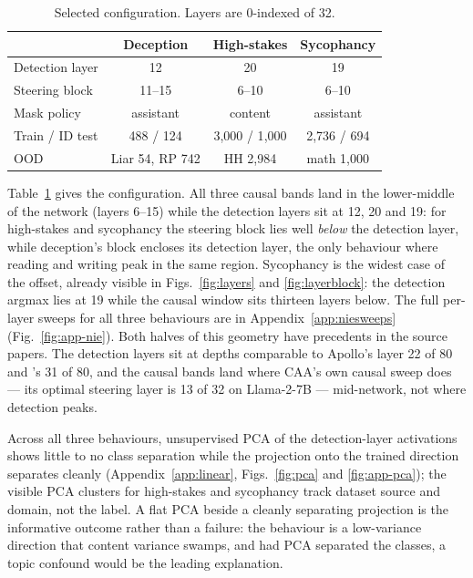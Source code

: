 \documentclass[conference]{IEEEtran}
\begin{document}
\begin{table}[t]
\caption{Selected configuration. Layers are 0-indexed of 32.}
\label{tab:config}
\centering
\small
\setlength{\tabcolsep}{3.5pt}
\begin{tabular}{lccc}
\toprule
& \textbf{Deception} & \textbf{High-stakes} & \textbf{Sycophancy} \\
\midrule
Detection layer & 12 & 20 & 19 \\
Steering block  & 11--15 & 6--10 & 6--10 \\
Mask policy & assistant & content & assistant \\
Train / ID test & 488 / 124 & 3{,}000 / 1{,}000 & 2{,}736 / 694 \\
OOD & Liar 54, RP 742 & HH 2{,}984 & math 1{,}000 \\
\bottomrule
\end{tabular}
\end{table}

Table~\ref{tab:config} gives the configuration. All three causal bands land in
the lower-middle of the network (layers 6--15) while the detection layers sit at
12, 20 and 19: for high-stakes and sycophancy the steering block lies well
\emph{below} the detection layer, while deception's block encloses its detection
layer, the only behaviour where reading and writing peak in the same region.
Sycophancy is the widest case of the offset, already visible in
Figs.~\ref{fig:layers} and \ref{fig:layerblock}: the detection argmax lies at
19 while the causal window sits thirteen layers below. The full per-layer sweeps for all three behaviours
are in Appendix~\ref{app:niesweeps} (Fig.~\ref{fig:app-nie}). Both
halves of this geometry have precedents in the source papers. The detection
layers sit at depths comparable to Apollo's layer 22 of 80 and
\citeauthor{mckenzie2025}'s 31 of 80, and the causal bands land where CAA's own
causal sweep does --- its optimal steering layer is 13 of 32 on Llama-2-7B
\citep{rimsky2024} --- mid-network, not where detection peaks.

Across all three behaviours, unsupervised PCA of the detection-layer activations
shows little to no class separation while the projection onto the trained
direction separates cleanly (Appendix~\ref{app:linear}, Figs.~\ref{fig:pca}
and \ref{fig:app-pca}); the
visible PCA clusters for high-stakes
and sycophancy track dataset source and domain, not the label. A flat PCA
beside a cleanly separating projection is the informative outcome rather than a
failure: the behaviour is a low-variance direction that content variance
swamps, and had PCA separated the classes, a topic confound would be the
leading explanation.
\end{document}
